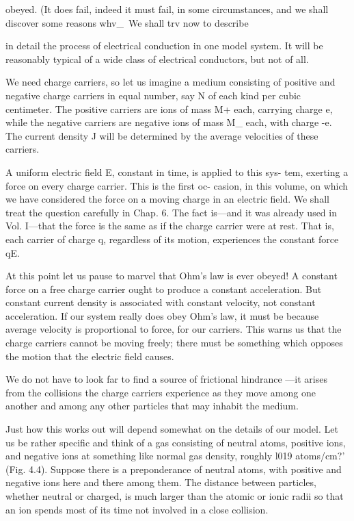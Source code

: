 obeyed. (It does fail, indeed it must fail, in some circumstances, and
we shall discover some reasons whv_\ We shall trv now to describe

in detail the process of electrical conduction in one model system.
It will be reasonably typical of a wide class of electrical conductors,
but not of all.

We need charge carriers, so let us imagine a medium consisting of
positive and negative charge carriers in equal number, say N of each
kind per cubic centimeter. The positive carriers are ions of mass M+
each, carrying charge e, while the negative carriers are negative ions
of mass M_ each, with charge -e. The current density J will be
determined by the average velocities of these carriers.

A uniform electric field E, constant in time, is applied to this sys-
tem, exerting a force on every charge carrier. This is the first oc-
casion, in this volume, on which we have considered the force on a
moving charge in an electric field. We shall treat the question carefully
in Chap. 6. The fact is---and it was already used in Vol. I---that
the force is the same as if the charge carrier were at rest. That is,
each carrier of charge q, regardless of its motion, experiences the
constant force qE.

At this point let us pause to marvel that Ohm's law is ever obeyed!
A constant force on a free charge carrier ought to produce a constant
acceleration. But constant current density is associated with constant
velocity, not constant acceleration. If our system really does
obey Ohm's law, it must be because average velocity is proportional
to force, for our carriers. This warns us that the charge carriers cannot
be moving freely; there must be something which opposes the
motion that the electric field causes.

We do not have to look far to find a source of frictional hindrance
---it arises from the collisions the charge carriers experience as they
move among one another and among any other particles that may
inhabit the medium.

Just how this works out will depend somewhat on the details of
our model. Let us be rather specific and think of a gas consisting of
neutral atoms, positive ions, and negative ions at something like normal
gas density, roughly l019 atoms/cm?' (Fig. 4.4). Suppose there
is a preponderance of neutral atoms, with positive and negative ions
here and there among them. The distance between particles,
whether neutral or charged, is much larger than the atomic or ionic
radii so that an ion spends most of its time not involved in a close
collision.

